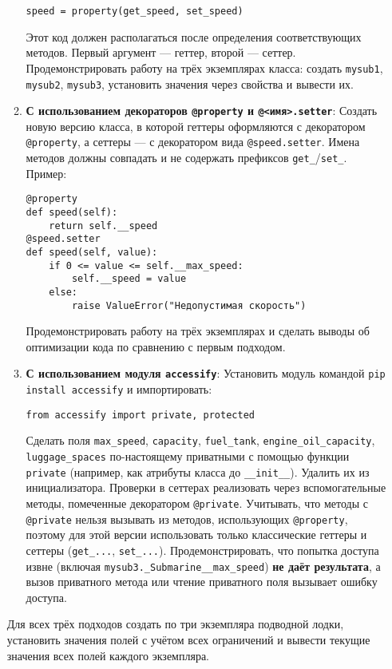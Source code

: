\begin{enumerate}
\begin{enumerate}
    \begin{verbatim}
speed = property(get_speed, set_speed)
    \end{verbatim}  
    Этот код должен располагаться после определения соответствующих методов. Первый аргумент — геттер, второй — сеттер.  
    Продемонстрировать работу на трёх экземплярах класса: создать \texttt{mysub1}, \texttt{mysub2}, \texttt{mysub3}, установить значения через свойства и вывести их.
    \item \textbf{С использованием декораторов \texttt{@property} и \texttt{@<имя>.setter}}:  
    Создать новую версию класса, в которой геттеры оформляются с декоратором \texttt{@property}, а сеттеры — с декоратором вида \texttt{@speed.setter}. Имена методов должны совпадать и не содержать префиксов \texttt{get\_}/\texttt{set\_}.  
    Пример:  
    \begin{verbatim}
@property
def speed(self):
    return self.__speed
@speed.setter
def speed(self, value):
    if 0 <= value <= self.__max_speed:
        self.__speed = value
    else:
        raise ValueError("Недопустимая скорость")
    \end{verbatim}  
    Продемонстрировать работу на трёх экземплярах и сделать выводы об оптимизации кода по сравнению с первым подходом.
    \item \textbf{С использованием модуля \texttt{accessify}}:  
    Установить модуль командой \texttt{pip install accessify} и импортировать:  
    \begin{verbatim}
from accessify import private, protected
    \end{verbatim}  
    Сделать поля \texttt{max\_speed}, \texttt{capacity}, \texttt{fuel\_tank}, \texttt{engine\_oil\_capacity}, \texttt{luggage\_spaces} по-настоящему приватными с помощью функции \texttt{private} (например, как атрибуты класса до \texttt{\_\_init\_\_}). Удалить их из инициализатора.  
    Проверки в сеттерах реализовать через вспомогательные методы, помеченные декоратором \texttt{@private}.  
    Учитывать, что методы с \texttt{@private} нельзя вызывать из методов, использующих \texttt{@property}, поэтому для этой версии использовать только классические геттеры и сеттеры (\texttt{get\_...}, \texttt{set\_...}).  
    Продемонстрировать, что попытка доступа извне (включая \texttt{mysub3.\_Submarine\_\_max\_speed}) \textbf{не даёт результата}, а вызов приватного метода или чтение приватного поля вызывает ошибку доступа.
\end{enumerate}
Для всех трёх подходов создать по три экземпляра подводной лодки, установить значения полей с учётом всех ограничений и вывести текущие значения всех полей каждого экземпляра.

\end{enumerate}
